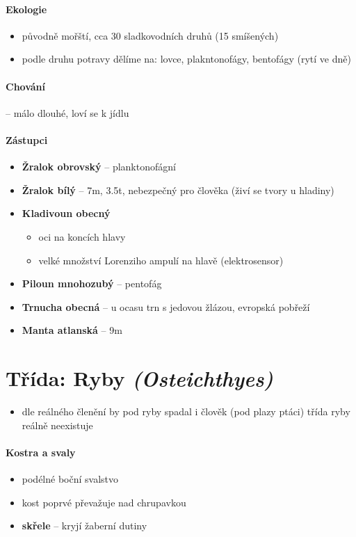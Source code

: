 \paragraph{Ekologie}
\begin{itemize}
\item původně mořští, cca 30 sladkovodních druhů (15 smíšených)
\item podle druhu potravy dělíme na: lovce, plakntonofágy, bentofágy (rytí ve dně)
\end{itemize}

\paragraph{Chování} -- málo dlouhé, loví se k jídlu

\paragraph{Zástupci}
\begin{itemize}
\item \textbf{Žralok obrovský} -- planktonofágní
\item \textbf{Žralok bílý} -- 7m, 3.5t, nebezpečný pro člověka (živí se tvory u hladiny)
\item \textbf{Kladivoun obecný}
	\begin{itemize}
	\item oci na koncích hlavy
	\item velké množství Lorenziho ampulí na hlavě (elektrosensor)
	\end{itemize}
\item \textbf{Piloun mnohozubý} -- pentofág
\item \textbf{Trnucha obecná} -- u ocasu trn s jedovou žlázou, evropská pobřeží
\item \textbf{Manta atlanská} -- 9m 
\end{itemize}



\newpage
\section{Třída: Ryby \textit{(Osteichthyes)}}
\begin{itemize}
\item dle reálného členění by pod ryby spadal i člověk (pod plazy ptáci) \ra třída ryby reálně neexistuje
\end{itemize}

\paragraph{Kostra a svaly}
\begin{itemize}
\item podélné boční svalstvo
\item kost poprvé převažuje nad chrupavkou
\item \textbf{skřele} -- kryjí žaberní dutiny
\end{itemize}

